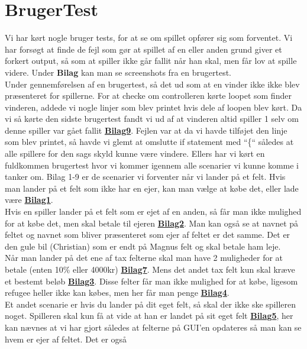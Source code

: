 \section*{BrugerTest}
Vi har kørt nogle bruger tests, for at se om spillet opfører sig som forventet.
Vi har forsøgt at finde de fejl som gør at spillet af en eller anden grund giver
et forkert output, så som at spiller ikke går fallit når han skal, men får lov
at spille videre. Under \textbf{Bilag} kan man se screenshots fra en
brugertest.\\
\indent Under gennemførelsen af en brugertest, så det ud som at en vinder ikke
ikke blev præsenteret for spillerne. For at checke om controlleren kørte loopet
som finder vinderen, addede vi nogle linjer som blev printet hvis dele af loopen
blev kørt. Da vi så kørte den sidste brugertest fandt vi ud af at vinderen altid
spiller 1 selv om denne spiller var gået fallit
\textbf{\hyperref[bilag9]{Bilag9}}.
Fejlen var at da vi havde tilføjet den linje som blev printet, så havde vi glemt at omslutte if
statement med “\{“ således at alle spillere for den sags skyld kunne være
vindere. Ellers har vi kørt en fuldkommen brugertest hvor vi kommer igennem alle
scenarier vi kunne komme i tanker om. Bilag 1-9 er de scenarier vi forventer når
vi lander på et felt. Hvis man lander på et felt som ikke har en ejer, kan man
vælge at købe det, eller lade være \textbf{\hyperref[bilag1]{Bilag1}}.\\
\indent Hvis en spiller lander på et felt som er ejet af en anden, så får man
ikke mulighed for at købe det, men skal betale til ejeren
\textbf{\hyperref[bilag2]{Bilag2}}. Man kan også se at navnet på feltet og
navnet som bliver præsenteret som ejer af feltet er det samme. Det er den gule bil
(Christian) som er endt på Magnus felt og skal betale ham leje.\\
\indent Når man lander på det ene af tax felterne skal man have 2 muligheder for
at betale (enten 10\% eller 4000kr) \textbf{\hyperref[bilag7]{Bilag7}}. Mens det
andet tax felt kun skal kræve et bestemt beløb
\textbf{\hyperref[bilag3]{Bilag3}}. Disse felter får man ikke mulighed for at
købe, ligesom refugee heller ikke kan købes, men her får man penge
\textbf{\hyperref[bilag4]{Bilag4}}.\\
\indent Et andet scenarie er hvis du lander på dit eget felt, så skal der ikke
ske spilleren noget. Spilleren skal kun få at vide at han er landet på sit eget
felt \textbf{\hyperref[bilag5]{Bilag5}}, her kan nævnes at vi har gjort således
at felterne på GUI’en opdateres så man kan se hvem er ejer af feltet. Det er også
